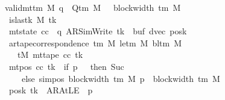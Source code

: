 \begin{isabellebody}
\ \ \ \ \ \ \ \ \ \ \ {\isasymlbrakk}\ valid{\isacharunderscore}{\kern0pt}mttm\ M{\isacharsemicolon}{\kern0pt}\ q\ {\isasymin}\ Q{\isacharunderscore}{\kern0pt}tm\ M{\isacharsemicolon}{\kern0pt}\ {}\ {\isasymle}\ block{\isacharunderscore}{\kern0pt}width\ {\isacharparenleft}{\kern0pt}{\isasymGamma}{\isacharunderscore}{\kern0pt}tm\ M{\isacharparenright}{\kern0pt}{\isacharsemicolon}{\kern0pt}\isanewline
\ \ \ \ \ \ \ \ \ \ \ \ \ is{\isacharunderscore}{\kern0pt}last{\isacharunderscore}{\kern0pt}k\ M\ tk{\isacharprime}{\kern0pt}{\isacharsemicolon}{\kern0pt}\isanewline
\ \ \ \ \ \ \ \ \ \ \ \ \ mt{\isacharunderscore}{\kern0pt}state\ cc\ {\isacharequal}{\kern0pt}\ {\isacharparenleft}{\kern0pt}q{\isacharcomma}{\kern0pt}\ AR{\isacharunderscore}{\kern0pt}SimWrite{\isacharcomma}{\kern0pt}\ tk{\isacharprime}{\kern0pt}{\isacharcomma}{\kern0pt}\ {}{\isacharcomma}{\kern0pt}\ buf{\isacharcomma}{\kern0pt}\ dvec{\isacharcomma}{\kern0pt}\ posk{\isacharparenright}{\kern0pt}{\isacharsemicolon}{\kern0pt}\isanewline
\ \ \ \ \ \ \ \ \ \ \ \ \ ar{\isacharunderscore}{\kern0pt}tape{\isacharunderscore}{\kern0pt}correspondence\ {\isacharparenleft}{\kern0pt}{\isasymGamma}{\isacharunderscore}{\kern0pt}tm\ M{\isacharparenright}{\kern0pt}\ {\isacharparenleft}{\kern0pt}le{\isacharunderscore}{\kern0pt}tm\ M{\isacharparenright}{\kern0pt}\ {\isacharparenleft}{\kern0pt}bl{\isacharunderscore}{\kern0pt}tm\ M{\isacharparenright}{\kern0pt}\isanewline
\ \ \ \ \ \ \ \ \ \ \ \ \ \ \ tM{\isacharprime}{\kern0pt}\ {\isacharparenleft}{\kern0pt}mt{\isacharunderscore}{\kern0pt}tape\ cc\ tk{\isacharprime}{\kern0pt}{\isacharparenright}{\kern0pt}{\isacharsemicolon}{\kern0pt}\isanewline
\ \ \ \ \ \ \ \ \ \ \ \ \ mt{\isacharunderscore}{\kern0pt}pos\ cc\ tk{\isacharprime}{\kern0pt}\ {\isacharequal}{\kern0pt}\ {\isacharparenleft}{\kern0pt}if\ p{\isacharprime}{\kern0pt}\ {\isacharequal}{\kern0pt}\ {}\ then\ Suc\ {}\isanewline
\ \ \ \ \ \ \ \ \ \ \ \ \ \ \ \ else\ sim{\isacharunderscore}{\kern0pt}pos\ {\isacharparenleft}{\kern0pt}block{\isacharunderscore}{\kern0pt}width\ {\isacharparenleft}{\kern0pt}{\isasymGamma}{\isacharunderscore}{\kern0pt}tm\ M{\isacharparenright}{\kern0pt}{\isacharparenright}{\kern0pt}\ p{\isacharprime}{\kern0pt}\ {\isacharplus}{\kern0pt}\ block{\isacharunderscore}{\kern0pt}width\ {\isacharparenleft}{\kern0pt}{\isasymGamma}{\isacharunderscore}{\kern0pt}tm\ M{\isacharparenright}{\kern0pt}{\isacharparenright}{\kern0pt}{\isacharsemicolon}{\kern0pt}\isanewline
\ \ \ \ \ \ \ \ \ \ \ \ \ posk\ tk{\isacharprime}{\kern0pt}\ {\isacharequal}{\kern0pt}\ AR{\isacharunderscore}{\kern0pt}AtLE\ {\isasymlongleftrightarrow}\ p{\isacharprime}{\kern0pt}\ {\isacharequal}{\kern0pt}\ {}{\isacharsemicolon}{\kern0pt}\isanewline

\end{isabellebody}
